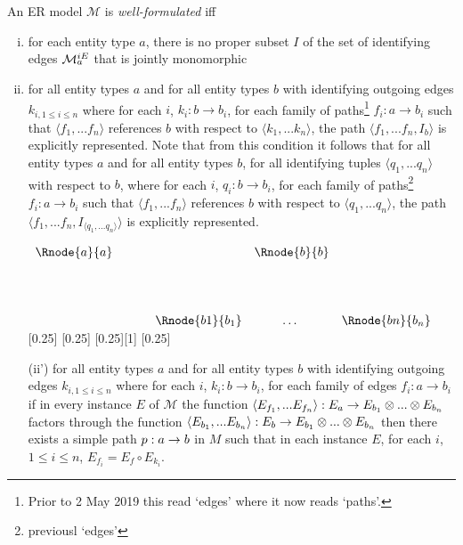 \documentclass[10pt,a4paper]{article}
\newcommand{\term}[1]{\textit{{#1}}}
\newcommand{\genericmodel}{\mathcal{M}}
\newcommand{\allIdentifying}{\genericmodel^{iE}}
\newcommand{\idEdges}[1]{\allIdentifying_{\raisebox{2pt}{$\scriptstyle{#1}$}}}
\begin{document}
\begin{definition}
\noindent An ER model $\genericmodel$ is \term{well-formulated} 
 iff 
\begin{enumerate} [(i)]
\item{
for each entity type $a$, there is no proper subset $I$ of the set of identifying edges $\idEdges{a}$ that  is jointly monomorphic
}
\item{ 
for all entity types $a$ and for all entity types $b$ with identifying outgoing edges
$k_{i, 1 \leq i \leq n}$ where for each $i$, $k_i: b \rightarrow b_i$,
for each  family of paths\footnote{Prior to 2 May 2019 this read `edges' where it now reads `paths'.} $f_i: a \rightarrow b_i$  such that  
$\langle f_1,...f_n \rangle$ references $b$ with respect to $\langle k_1,...k_n \rangle$,
the path $\langle f_1,...f_n,I_b \rangle$ is explicitly represented. 
Note that from this condition it follows
that for all entity types $a$ and for all entity types $b$,  for all  identifying tuples 
$\langle q_1,...q_n \rangle$ 
with respect to $b$, where for each $i$, $q_i: b \rightarrow b_i$,
for each  family of paths\footnote{previousl `edges'} $f_i: a \rightarrow b_i$  such that  
$\langle f_1,...f_n \rangle$ references $b$ with respect to $\langle q_1,...q_n \rangle$,
the path $\langle f_1,...f_n,I_{\langle q_1,...q_n \rangle} \rangle$ is explicitly represented.

\begin{center}
$
\begin{array}{cp{0.5cm}c c c }
   \Rnode{a}{a}     & &                 & \Rnode{b}{b} &          \\[1.5cm]     
	                  & & \Rnode{b1}{b_1} & \ \hdots   \ \     & \Rnode{bn}{b_n}  
\end{array}
$
[0.25]
[0.25]
[0.25][1]
\idcomp
[0.25]
\idcomp
\end{center}
}

\item [(ii')]{  
for all entity types $a$ and for all entity types $b$ with identifying outgoing edges
$k_{i, 1 \leq i \leq n}$ where for each $i$, $k_i: b \rightarrow b_i$,
for each  family of edges $f_i: a \rightarrow b_i$
if in every instance $E$ of $\genericmodel$ the function $\langle E_{f_1},...E_{f_n}\rangle:E_a \rightarrow E_{b_1} \otimes ... \otimes E_{b_n}$
factors through the function $\langle E_{b_1},...E_{b_n}\rangle:E_b \rightarrow E_{b_1} \otimes ... \otimes E_{b_n}$ then there exists a simple path
$p:a \rightarrow b$ in $M$ such that in each instance $E$, for each $i$, $1 \leq i \leq n$, $E_{f_i} = E_{f} \circ E_{k_i}$. 
}


\end{enumerate}
\end{definition}
\end{document}
